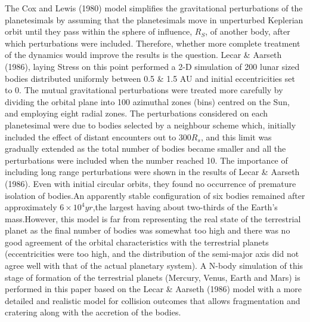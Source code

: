The Cox and Lewis (1980) model simplifies the gravitational perturbations of the planetesimals by assuming that the planetesimals move in unperturbed Keplerian orbit until they pass within the sphere of influence, $R_{S}$, of another body, after which perturbations were included. Therefore, whether more complete treatment of the dynamics would improve the results is the question.
Lecar \& Aarseth (1986), laying Stress on this point performed a 2-D simulation of 200 lunar sized bodies distributed uniformly between 0.5 \& 1.5 AU and initial  
eccentricities set to 0. The mutual gravitational perturbations were treated more carefully by dividing the orbital plane into 100 azimuthal zones (bins) centred on the Sun, and employing eight
radial zones. The perturbations considered
on each planetesimal were due to bodies selected by a neighbour scheme which, initially included the effect of distant encounters out to $300 R_{s}$, and this limit was gradually extended as the total number of bodies became smaller and all the perturbations were included when the number reached 10.
The importance of including long range perturbations were shown in the results of Lecar \& Aarseth (1986).
Even with initial circular orbits, they found no occurrence of premature isolation of bodies.An
apparently stable configuration of six bodies remained after approximately $6\times 10^{4} yr$,the largest having about two-thirds of the Earth's mass.However, this model is far from representing the real state of
the terrestrial planet as the final number of bodies was somewhat too high and there was no good agreement of the orbital characteristics with the terrestrial planets (eccentricities were too high, and the distribution of the semi-major axis did not agree well with that of the actual planetary system). 
A N-body simulation of this stage of formation of the terrestrial planets (Mercury, Venus, Earth and Mars) is performed in this paper\cite{1990MNRAS.245...30B} based on the Lecar \& Aarseth (1986) model with a more detailed and realistic model for collision outcomes that allows fragmentation and cratering along with the accretion of the bodies.
